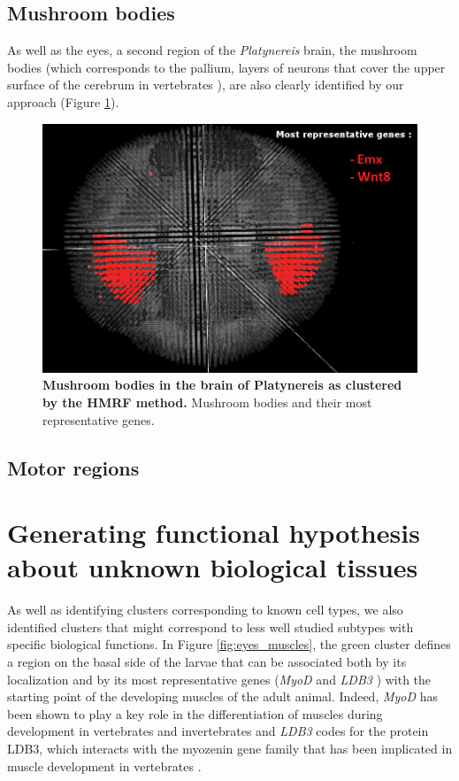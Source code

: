 	
		\subsection{Mushroom bodies}
		As well as the eyes, a second region of the {\it{Platynereis}} brain, the mushroom bodies (which corresponds to the pallium, layers of neurons that cover the upper surface of the cerebrum in vertebrates \cite{Tomer10}), are also clearly identified by our approach (Figure \ref{fig:validmush}).
		
	\begin{figure}[h]
\centerline{\includegraphics[width=0.6\linewidth]{gfx/chapter6/mush.png}}
\caption{{\bf Mushroom bodies in the brain of Platynereis as clustered by the HMRF method.} Mushroom bodies and their most representative genes.}
\label{fig:validmush}
	\end{figure}
		\subsection{Motor regions}

	\section{Generating functional hypothesis about unknown biological tissues}
	As well as identifying clusters corresponding to known cell types, we also identified clusters that might correspond to less well studied subtypes with specific biological functions. In Figure \ref{fig:eyes_muscles}, the green cluster defines a region on the basal side of the larvae that can be associated both by its localization and by its most representative genes ({\it{MyoD}} \cite{weintraub91,michelson90} and {\it{LDB3}} \cite{krcmery10,marziliano07}) with the starting point of the developing muscles of the adult animal. Indeed, {\it{MyoD}} has been shown to play a key role in the differentiation of muscles during development in vertebrates and invertebrates \cite{weintraub91,michelson90} and {\it{LDB3}} codes for the protein LDB3, which interacts with the myozenin gene family that has been implicated in muscle development in vertebrates \cite{marziliano07}.\\


